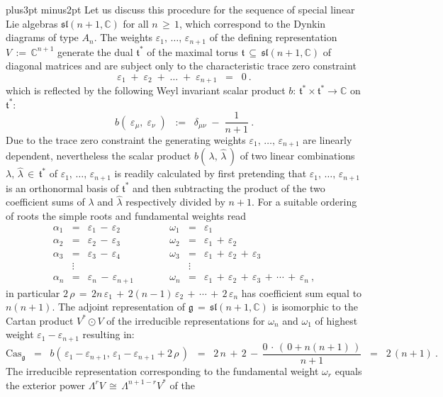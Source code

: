 \documentclass[12pt]{article}
\def\C{\mathbb{C}}
\def\Cas{\mathrm{Cas}}
\def\e{\varepsilon}
\def\g{\mathfrak{g}}
\def\L{\Lambda}
\def\pfill{\vskip6pt plus3pt minus2pt\noindent}
\def\sl{\mathfrak{sl}}
\def\t{\mathfrak{t}}
\begin{document}
 \pfill
 Let us discuss this procedure for the sequence of special linear Lie
 algebras $\sl(n+1,\C)$ for all $n\,\geq\,1$, which correspond to the
 Dynkin diagrams of type $A_n$. The weights $\e_1,\,\ldots,\,\e_{n+1}$ of
 the defining representation $V\,:=\,\C^{n+1}$ generate the dual $\t^*$
 of the maximal torus $\t\,\subseteq\,\sl(n+1,\C)$ of diagonal matrices
 and are subject only to the characteristic trace zero constraint
 $$
  \e_1\;+\;\e_2\;+\;\ldots\;+\;\e_{n+1}
  \;\;=\;\;
  0\ .
 $$
 which is reflected by the following Weyl invariant scalar product
 $b:\,\t^*\times\t^*\longrightarrow\C$ on $\t^*$:
 \begin{equation}\label{slnpro}
  b(\;\e_\mu,\;\e_\nu\;)
  \;\;:=\;\;
  \delta_{\mu\nu}\;-\;\frac1{n+1}\ .
 \end{equation}
 Due to the trace zero constraint the generating weights $\e_1,\,\ldots,
 \,\e_{n+1}$ are linearly dependent, nevertheless the scalar product
 $b(\,\lambda,\,\hat\lambda\,)$ of two linear combinations $\lambda,
 \,\hat\lambda\,\in\,\t^*$ of $\e_1,\,\ldots,\,\e_{n+1}$ is readily
 calculated by first pretending that $\e_1,\,\ldots,\,\e_{n+1}$ is an
 orthonormal basis of $\t^*$ and then subtracting the product of the
 two coefficient sums of $\lambda$ and $\hat\lambda$ respectively
 divided by $n+1$. For a suitable ordering of roots the simple roots and
 fundamental weights read
 $$
  \begin{array}{lclclcl}
   \alpha_1&=&\e_1\,-\,\e_2&\qquad&
   \omega_1&=&\e_1
   \\
   \alpha_2&=&\e_2\,-\,\e_3&&
   \omega_2&=&\e_1\,+\,\e_2
   \\
   \alpha_3&=&\e_3\,-\,\e_4&&
   \omega_3&=&\e_1\,+\,\e_2\,+\,\e_3
   \\
   &\vdots&&&&\vdots&
   \\
   \alpha_n&=&\e_n\,-\,\e_{n+1}&&
   \omega_n&=&\e_1\,+\,\e_2\,+\,\e_3\,+\,\cdots\,+\,\e_n\ ,
  \end{array}
 $$
 in particular $2\,\rho\,=\,2n\,\e_1\,+\,2(n-1)\,\e_2\,+\,\cdots\,+\,2\,\e_n$
 has coefficient sum equal to $n(n+1)$. The adjoint representation of
 $\g\,=\,\sl(n+1,\C)$ is isomorphic to the Cartan product $V^*\odot V$
 of the irreducible representations for $\omega_n$ and $\omega_1$ of
 highest weight $\e_1-\e_{n+1}$ resulting in:
 $$
  \Cas_\g
  \;\;=\;\;
  b(\,\e_1-\e_{n+1},\,\e_1-\e_{n+1}+2\,\rho\,)
  \;\;=\;\;
  2\,n\,+\,2\,-\,\frac{0\,\cdot\,(\,0+n(n+1)\,)}{n+1}
  \;\;=\;\;
  2\,(n+1)\ .
 $$
 The irreducible representation corresponding to the fundamental weight
 $\omega_r$ equals the exterior power $\L^rV\,\cong\,\L^{n+1-r}V^*$ of the
\end{document}
